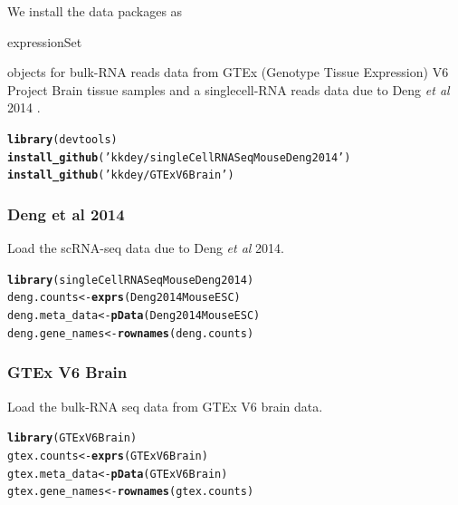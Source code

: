 \documentclass[12pt]{article}\usepackage[]{graphicx}\usepackage[usenames,dvipsnames]{color}
\makeatletter
\newcommand{\hlstr}[1]{\textcolor[rgb]{0.192,0.494,0.8}{#1}}%
\newcommand{\hlstd}[1]{\textcolor[rgb]{0.345,0.345,0.345}{#1}}%
\newcommand{\hlkwb}[1]{\textcolor[rgb]{0.69,0.353,0.396}{#1}}%
\newcommand{\hlkwd}[1]{\textcolor[rgb]{0.737,0.353,0.396}{\textbf{#1}}}%
\newenvironment{kframe}{%
 \def\at@end@of@kframe{}%
 \ifinner\ifhmode%
  \def\at@end@of@kframe{\end{minipage}}%
  \begin{minipage}{\columnwidth}%
 \fi\fi%
 \def\FrameCommand##1{\hskip\@totalleftmargin \hskip-\fboxsep
 \colorbox{shadecolor}{##1}\hskip-\fboxsep
     \hskip-\linewidth \hskip-\@totalleftmargin \hskip\columnwidth}%
 \MakeFramed {\advance\hsize-\width
   \@totalleftmargin\z@ \linewidth\hsize
   \@setminipage}}%
 {\par\unskip\endMakeFramed%
 \at@end@of@kframe}
\newenvironment{knitrout}{}{} %
\makeatother
\begin{document}
We install the data packages as \begin{verb} expressionSet \end{verb} objects for bulk-RNA reads data from GTEx (Genotype Tissue Expression) V6 Project Brain tissue samples \cite{GTEx2013} and a singlecell-RNA reads data due to Deng \textit{et al} 2014 \cite{Deng2014}.


\begin{knitrout}
\color{fgcolor}\begin{kframe}
\begin{alltt}
\hlkwd{library}\hlstd{(devtools)}
\hlkwd{install_github}\hlstd{(}\hlstr{'kkdey/singleCellRNASeqMouseDeng2014'}\hlstd{)}
\hlkwd{install_github}\hlstd{(}\hlstr{'kkdey/GTExV6Brain'}\hlstd{)}
\end{alltt}
\end{kframe}
\end{knitrout}

\subsubsection{Deng et al 2014}

Load the scRNA-seq data due to Deng \textit{et al} 2014.

\begin{knitrout}
\color{fgcolor}\begin{kframe}
\begin{alltt}
\hlkwd{library}\hlstd{(singleCellRNASeqMouseDeng2014)}
\hlstd{deng.counts} \hlkwb{<-} \hlkwd{exprs}\hlstd{(Deng2014MouseESC)}
\hlstd{deng.meta_data} \hlkwb{<-} \hlkwd{pData}\hlstd{(Deng2014MouseESC)}
\hlstd{deng.gene_names} \hlkwb{<-} \hlkwd{rownames}\hlstd{(deng.counts)}
\end{alltt}
\end{kframe}
\end{knitrout}

\subsubsection{GTEx V6 Brain}

Load the bulk-RNA seq data from GTEx V6 brain data.

\begin{knitrout}
\color{fgcolor}\begin{kframe}
\begin{alltt}
\hlkwd{library}\hlstd{(GTExV6Brain)}
\hlstd{gtex.counts} \hlkwb{<-} \hlkwd{exprs}\hlstd{(GTExV6Brain)}
\hlstd{gtex.meta_data} \hlkwb{<-} \hlkwd{pData}\hlstd{(GTExV6Brain)}
\hlstd{gtex.gene_names} \hlkwb{<-} \hlkwd{rownames}\hlstd{(gtex.counts)}
\end{alltt}
\end{kframe}
\end{knitrout}
\end{document}
